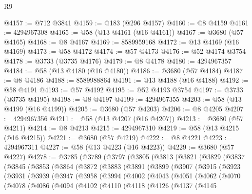 \begin{lexlean}{R9}
\begin{coremodule}
@4157 := @712 @3841
@4159 := @183 (@296 @4157)
@4160 := @8 @4159
@4161 := 4294967308
@4165 := @58 (@13 @4161 (@16 @4161))
@4167 := @3680 (@57 @4165)
@4168 := @8 @4167
@4169 := 8589959168
@4172 := @13 @4169 (@16 @4169)
@4173 := @58 @4172
@4174 := @57 @4173
@4176 := @52 @4174 @3754
@4178 := @3733 (@3735 @4176)
@4179 := @8 @4178
@4180 := 4294967357
@4184 := @58 (@13 @4180 (@16 @4180))
@4186 := @3680 (@57 @4184)
@4187 := @8 @4186
@4188 := 8589988864
@4191 := @13 @4188 (@16 @4188)
@4192 := @58 @4191
@4193 := @57 @4192
@4195 := @52 @4193 @3754
@4197 := @3733 (@3735 @4195)
@4198 := @8 @4197
@4199 := 4294967355
@4203 := @58 (@13 @4199 (@16 @4199))
@4205 := @3680 (@57 @4203)
@4206 := @8 @4205
@4207 := 4294967356
@4211 := @58 (@13 @4207 (@16 @4207))
@4213 := @3680 (@57 @4211)
@4214 := @8 @4213
@4215 := 4294967310
@4219 := @58 (@13 @4215 (@16 @4215))
@4221 := @3680 (@57 @4219)
@4222 := @8 @4221
@4223 := 4294967311
@4227 := @58 (@13 @4223 (@16 @4223))
@4229 := @3680 (@57 @4227)
@4278 := @3785
    (@3789
      (@3797
        (@3805
          (@3813
            (@3821
              (@3829
                (@3837
                  (@3845
                    (@3853
                      (@3864
                        (@3872
                          (@3883
                            (@3891
                              (@3899
                                (@3907
                                  (@3915
                                    (@3923
                                      (@3931
                                        (@3939
                                          (@3947
                                            (@3958
                                              (@3994
                                                (@4002
                                                  (@4043
                                                    (@4051
                                                      (@4062
                                                        (@4070
                                                          (@4078
                                                            (@4086
                                                              (@4094
                                                                (@4102
                                                                  (@4110
                                                                    (@4118
                                                                      (@4126
                                                                        (@4137
                                                                          (@4145

\end{coremodule}
\end{lexlean}
